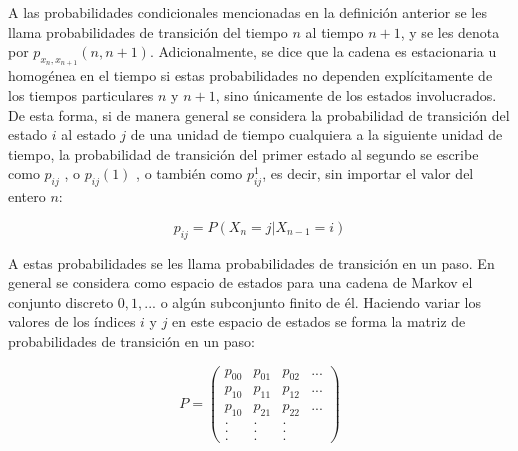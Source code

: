 A las probabilidades condicionales mencionadas en la definición anterior se les
llama probabilidades de transición del tiempo $n$ al tiempo $n+1$, y se les
denota por $p_{x_n, x_{n+1}}(n, n +1)$. Adicionalmente, se dice que la cadena es
estacionaria u homogénea en el tiempo si estas probabilidades no dependen
explícitamente de los tiempos particulares $n$ y $n+1$, sino únicamente de los
estados involucrados. De esta forma, si de manera general se considera la
probabilidad de transición del estado $i$ al estado $j$ de una unidad de tiempo
cualquiera a la siguiente unidad de tiempo, la probabilidad de transición del
primer estado al segundo se escribe como $p_{ij}$ , o $p_{ij}(1)$ , o también
como $p_{ij}^{1}$, es decir, sin importar el valor del entero $n$:

\begin{equation}
    p_{ij} = P(X_n = j | X_{n-1} = i)
\end{equation}

A estas probabilidades se les llama probabilidades de transición en un paso. En
general se considera como espacio de estados para una cadena de Markov el
conjunto discreto $0, 1, ...$ o algún subconjunto finito de él. Haciendo variar
los valores de los índices $i$ y $j$ en este espacio de estados se forma la
matriz de probabilidades de transición en un paso:

\begin{equation}
    P = \begin{pmatrix}
        p_{00}  & p_{01}    & p_{02}    & ... \\
        p_{10}  & p_{11}    & p_{12}    & ... \\
        p_{10}  & p_{21}    & p_{22}    & ... \\
        .       & .         & .         &     \\
        .       & .         & .         &     \\
        .       & .         & .         &
    \end{pmatrix}
\end{equation}
